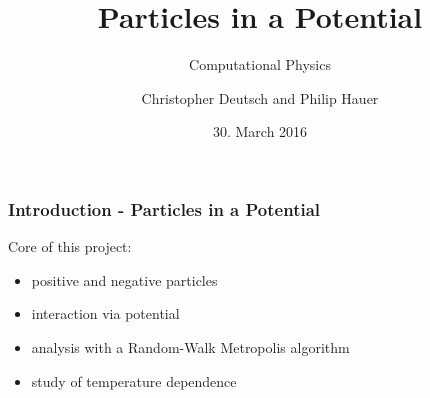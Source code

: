 \documentclass[mathserif,serif]{beamer}
\author{Christopher Deutsch and Philip Hauer}
\title{Particles in a Potential}
\date{30. March 2016}
\subtitle{{\small Computational Physics}}
\begin{document}
\frame[plain]{\titlepage}
\setcounter{framenumber}{0}
\begin{frame}
	\frametitle{Introduction - Particles in a Potential}
	
		
			Core of this project:
			\begin{itemize}
			\setlength\itemsep{1.5em}
				\item positive and negative particles
				\item interaction via potential
				\item analysis with a Random-Walk Metropolis algorithm
				\item study of temperature dependence
			\end{itemize}
			
\end{frame}





\end{document}
